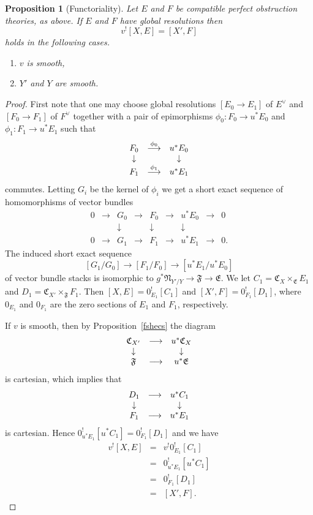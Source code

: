 \documentclass[11pt]{article}
\theoremstyle{plain}
\newtheorem{prop}{Proposition}[section]
\theoremstyle{definition}
\newenvironment{pf}{\begin{proof}}{\end{proof}}
\newcommand{\dual}[1]{{{#1}^{\vee}}}
\newcommand{\upst}{^{\ast}}
\newcommand{\upsh}{^{!}}
\newcommand{\EE}{{\mathfrak{E}}}
\newcommand{\FF}{{\mathfrak{F}}}
\newcommand{\NN}{{\mathfrak{N}}}
\newcommand{\CC}{{\mathfrak{C}}}
\newcommand{\ldiag}[1]
       {\makebox[0cm]{\({\scriptstyle#1}\downarrow\phantom{\scriptstyle#1}\)}}
\newcommand{\rdiag}[1]
       {\makebox[0cm]{\(\phantom{\scriptstyle#1}\downarrow{\scriptstyle#1}\)}}
\newcommand{\comdia}[9]{
\begin{array}{ccc}
#1 & \stackrel{#2}{\longrightarrow} & #3 \\
\ldiag{#4} & #5 & \rdiag{#6} \\
#7 & \stackrel{#8}{\longrightarrow} & #9
\end{array}}
\theoremstyle{plain}
\theoremstyle{definition}
\theoremstyle{remark}
\begin{document}
\begin{prop}[Functoriality] \label{fcrp}
Let \(E\) and \(F\) be compatible perfect  obstruction theories, as above.
If \(E\) and \(F\) have global resolutions then
\[
v\upsh[X,E]=[X',F]
\]
holds in the following cases.
\begin{enumerate}
\item \label{fcrp1} \(v\) is smooth,
\item \label{fcrp2} \(Y'\) and \(Y\) are smooth.
\end{enumerate}
\end{prop}
\begin{pf}
First note that one may choose global resolutions \([E_0\rightarrow
E_1]\) of \(\dual{E}\) and \([F_0\to F_1]\) of \(\dual{F}\) together with a
pair of epimorphisms \(\phi_0:F_0\to u\upst E_0\) and \(\phi_1:F_1\to
u\upst E_1\) such that
\[
\comdia{F_0}{\phi_0}{u\upst E_0}{}{}{}{F_1}{\phi_1}{u\upst E_1}
\]
commutes. Letting \(G_i\) be the kernel of \(\phi_i\) we get a short exact
sequence of homomorphisms of vector bundles
\[
\begin{array}{ccccccccc}
0 & \longrightarrow & G_0 & \longrightarrow & F_0 & \longrightarrow &
u\upst E_0 & \longrightarrow & 0\\
& & \downarrow & & \downarrow & & \downarrow & & \\
0 & \longrightarrow & G_1 & \longrightarrow & F_1 & \longrightarrow &
u\upst E_1 & \longrightarrow & 0.
\end{array}
\]
The induced short exact sequence
\[
[G_1/G_0]\longrightarrow [F_1/F_0]\longrightarrow [u\upst E_1/u\upst
E_0]
\]
of vector bundle stacks is isomorphic to
\(g\upst\NN_{Y'/Y}\to\FF\to \EE\). We let \(C_1=\CC_X\times_{\EE}E_1\) and
\(D_1=\CC_{X'}\times_{\FF}F_1\). Then \([X,E]=0_{E_1}\upsh[C_1]\) and
\([X',F]=0_{F_1}\upsh[D_1]\), where \(0_{E_1}\) and \(0_{F_1}\) are the zero
sections of \(E_1\) and \(F_1\), respectively.

If \(v\) is smooth, then by Proposition~\ref{fshecs} the diagram
\[
\comdia{\CC_{X'}}{}{u\upst\CC_X}{}{}{}{\FF}{}{u\upst\EE}
\]
is cartesian, which implies that
\[
\comdia{D_1}{}{u\upst C_1}{}{}{}{F_1}{}{u\upst E_1}
\]
is cartesian. Hence \(0_{u\upst E_1}\upsh[u\upst C_1]=0_{
F_1}\upsh[D_1]\) and we have
\begin{eqnarray*}
v\upsh[X,E] & = & v\upsh 0_{E_1}\upsh[C_1] \\
            & = & 0_{u\upst E_1}\upsh[u\upst C_1] \\
            & = & 0_{F_1}\upsh[D_1] \\
            & = & [X',F].
\end{eqnarray*}


\end{pf}
\end{document}
